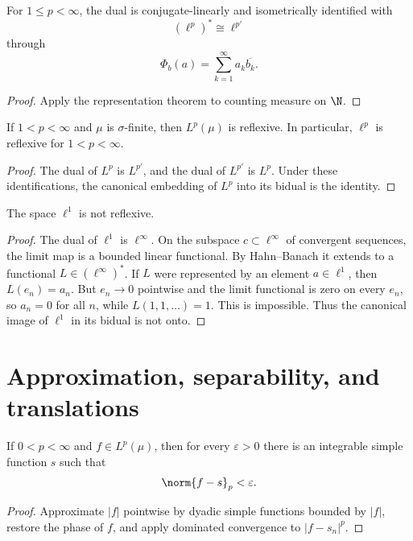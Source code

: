 \begin{cor}
For $1\leq p<\infty$, the dual is conjugate-linearly and isometrically identified with
\[
(\ell^p)^*\cong\ell^{p'}
\]
through
\[
\Phi_b(a)=\sum_{k=1}^{\infty}a_k\overline{b_k}.
\]
\end{cor}

\begin{proof}
Apply the representation theorem to counting measure on $\N$.
\end{proof}

\begin{thm}[Reflexivity]
If $1<p<\infty$ and $\mu$ is $\sigma$-finite, then $L^p(\mu)$ is reflexive. In particular, $\ell^p$ is reflexive for $1<p<\infty$.
\end{thm}

\begin{proof}
The dual of $L^p$ is $L^{p'}$, and the dual of $L^{p'}$ is $L^p$. Under these identifications, the canonical embedding of $L^p$ into its bidual is the identity.
\end{proof}

\begin{prop}
The space $\ell^1$ is not reflexive.
\end{prop}

\begin{proof}
The dual of $\ell^1$ is $\ell^\infty$. On the subspace $c\subset\ell^\infty$ of convergent sequences, the limit map is a bounded linear functional. By Hahn--Banach it extends to a functional $L\in(\ell^\infty)^*$. If $L$ were represented by an element $a\in\ell^1$, then $L(e_n)=a_n$. But $e_n\to0$ pointwise and the limit functional is zero on every $e_n$, so $a_n=0$ for all $n$, while $L(1,1,\dots)=1$. This is impossible. Thus the canonical image of $\ell^1$ in its bidual is not onto.
\end{proof}

\section{Approximation, separability, and translations}

\begin{thm}
If $0<p<\infty$ and $f\in L^p(\mu)$, then for every $\varepsilon>0$ there is an integrable simple function $s$ such that
\[
\norm{f-s}_p<\varepsilon.
\]
\end{thm}

\begin{proof}
Approximate $|f|$ pointwise by dyadic simple functions bounded by $|f|$, restore the phase of $f$, and apply dominated convergence to $|f-s_n|^p$.
\end{proof}


